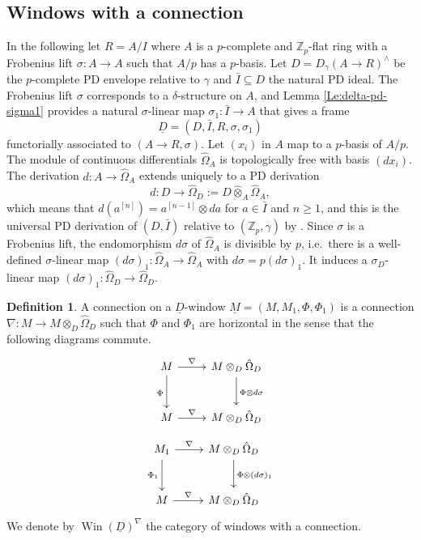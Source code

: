\documentclass[a4paper,11pt]{article}
\theoremstyle{plain}
\theoremstyle{definition}
\newtheorem{Defn}[Lemma]{Definition}
\theoremstyle{remark}
\theoremstyle{definition}
\numberwithin{Lemma}{section}
\numberwithin{Subpoint}{Lemma}
\numberwithin{equation}{section}
\newcommand{\ZZ}{{\mathbb{Z}}}
\DeclareMathOperator{\Win}{Win}
\newcommand{\hatotimes}{\mathbin{\hat\otimes}}
\renewcommand{\u}{\underline}
\newcommand{\chang}[1]{{#1}}
\begin{document}
\subsection*{Windows with a connection}

\chang{In the following let $R=A/I$ where $A$ is a $p$-complete and $\ZZ_p$-flat ring with a Frobenius lift $\sigma:A\to A$ such that $A/p$ has a $p$-basis. Let $D=D_{\gamma}(A\to R)^\wedge$ be the $p$-complete PD envelope relative to $\gamma$ and $\bar I\subseteq D$ the natural PD ideal. The Frobenius lift $\sigma$ corresponds to a $\delta$-structure on $A$, and Lemma \ref{Le:delta-pd-sigma1} provides a natural $\sigma$-linear map $\sigma_1:\bar I\to A$ that gives a frame
\[
\u D=(D,\bar I,R,\sigma,\sigma_1)
\]
functorially associated to $(A\to R,\sigma)$.}
Let $(x_i)$ in $A$ map to a $p$-basis of $A/p$.
The module of continuous differentials $\hat\Omega_A$ is topologically
free with basis $(dx_i)$. The derivation $d:A\to\hat\Omega_A$ extends
uniquely to a PD derivation
\[
d:D\to\hat\Omega_D:=D\hatotimes_A\hat\Omega_A,
\]
which means that $d(a^{[n]})=a^{[n-1]}\otimes da$ 
for $a\in\bar I$ and $n\ge 1$,
and this is the universal PD derivation of $(D,\bar I)$ relative to $(\ZZ_p,\gamma)$ by \cite[\href{https://stacks.math.columbia.edu/tag/07HW}{Tag 07HW}]{Stacks-Project}.
Since $\sigma$ is a Frobenius lift, 
the endomorphism $d\sigma$ of $\hat\Omega_A$ 
is divisible by $p$, i.e.\ there is a well-defined $\sigma$-linear map
$(d\sigma)_1:\hat\Omega_A\to\hat\Omega_A$ with $d\sigma=p(d\sigma)_1$.
It induces a $\sigma_D$-linear map $(d\sigma)_1:\hat\Omega_D\to\hat\Omega_D$.

\begin{Defn}
\label{Def:win-nabla}
A connection on a $\u D$-window $\u M=(M, M_1,\Phi,\Phi_1)$
is a connection 
$\nabla:M\to M\otimes_D\hat\Omega_D$ such that $\Phi$ and $\Phi_1$
are horizontal in the sense that the following diagrams commute.
\begin{equation}
\label{Eq:Win-nabla-Phi}
\xymatrix@M+0.2em{
M \ar[r]^-\nabla \ar[d]_\Phi &
M\otimes_D\hat\Omega_D \ar[d]^{\Phi\otimes d\sigma} \\
M \ar[r]^-\nabla & M\otimes_D\hat\Omega_D
}
\end{equation}
\begin{equation}
\label{Eq:Win-nabla-Phi1}
\xymatrix@M+0.2em{
 M_1 \ar[r]^-\nabla \ar[d]_{\Phi_1} &
M\otimes_D\hat\Omega_D \ar[d]^{\Phi\otimes (d\sigma)_1} \\
M \ar[r]^-\nabla & M\otimes_D\hat\Omega_D
}
\end{equation}
We denote by $\Win(\u D)^\nabla$ the category of windows with a connection.
\end{Defn}
\end{document}
